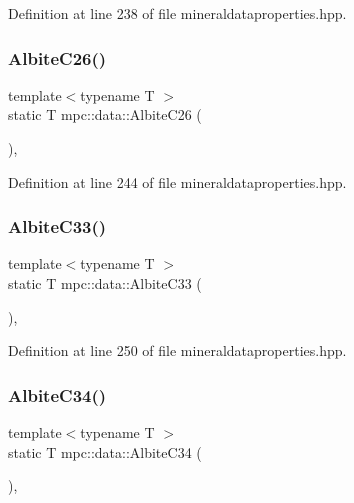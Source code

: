 Definition at line 238 of file mineraldataproperties.\+hpp.

\mbox{\label{namespacempc_1_1data_aef8dd5e2750641ef11774255e442766e}} 
\subsubsection{\texorpdfstring{Albite\+C26()}{AlbiteC26()}}
{\footnotesize\ttfamily template$<$typename T $>$ \\
static T mpc\+::data\+::\+Albite\+C26 (\begin{DoxyParamCaption}{ }\end{DoxyParamCaption})\hspace{0.3cm}{\ttfamily [inline]}, {\ttfamily [static]}}



Definition at line 244 of file mineraldataproperties.\+hpp.

\mbox{\label{namespacempc_1_1data_a43c94697f4d2bec0934d9d5757596363}} 
\subsubsection{\texorpdfstring{Albite\+C33()}{AlbiteC33()}}
{\footnotesize\ttfamily template$<$typename T $>$ \\
static T mpc\+::data\+::\+Albite\+C33 (\begin{DoxyParamCaption}{ }\end{DoxyParamCaption})\hspace{0.3cm}{\ttfamily [inline]}, {\ttfamily [static]}}



Definition at line 250 of file mineraldataproperties.\+hpp.

\mbox{\label{namespacempc_1_1data_a76d15c2d1d52700bef086e696fcc81df}} 
\subsubsection{\texorpdfstring{Albite\+C34()}{AlbiteC34()}}
{\footnotesize\ttfamily template$<$typename T $>$ \\
static T mpc\+::data\+::\+Albite\+C34 (\begin{DoxyParamCaption}{ }\end{DoxyParamCaption})\hspace{0.3cm}{\ttfamily [inline]}, {\ttfamily [static]}}



